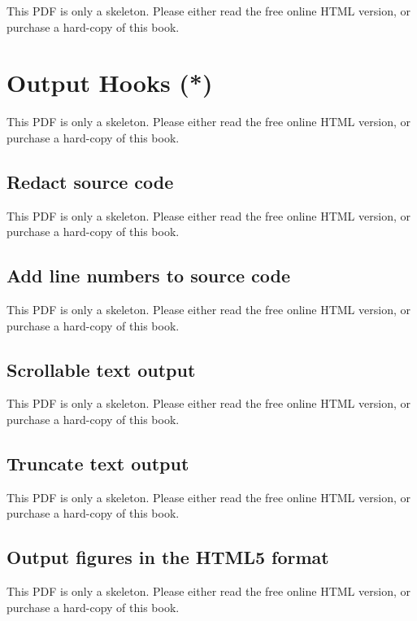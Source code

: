 \documentclass[
  11pt,
]{krantz}
\begin{document}
This PDF is only a skeleton. Please either read the free online HTML version, or purchase a hard-copy of this book.

\chapter{Output Hooks (*)}\label{output-hooks}

This PDF is only a skeleton. Please either read the free online HTML version, or purchase a hard-copy of this book.

\section{Redact source code}\label{hook-hide}

This PDF is only a skeleton. Please either read the free online HTML version, or purchase a hard-copy of this book.

\section{Add line numbers to source code}\label{hook-number}

This PDF is only a skeleton. Please either read the free online HTML version, or purchase a hard-copy of this book.

\section{Scrollable text output}\label{hook-scroll}

This PDF is only a skeleton. Please either read the free online HTML version, or purchase a hard-copy of this book.

\section{Truncate text output}\label{hook-truncate}

This PDF is only a skeleton. Please either read the free online HTML version, or purchase a hard-copy of this book.

\section{Output figures in the HTML5 format}\label{hook-html5}

This PDF is only a skeleton. Please either read the free online HTML version, or purchase a hard-copy of this book.
\end{document}
